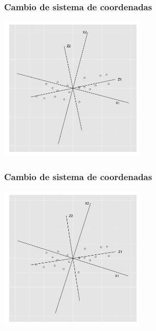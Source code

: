 \documentclass{beamer}
\begin{document}
\begin{frame}\frametitle{Cambio de sistema de coordenadas}
   \begin{overlayarea}{\textwidth}{8cm} 
 \begin{center}
   \includegraphics[height=7cm]{x1x2z1z2rotated06.png}
 \end{center}
   \end{overlayarea}
 \end{frame}
\begin{frame}\frametitle{Cambio de sistema de coordenadas}
   \begin{overlayarea}{\textwidth}{8cm} 
 \begin{center}
   \includegraphics[height=7cm]{x1x2z1z2rotated07.png}
 \end{center}
   \end{overlayarea}
 \end{frame}
\end{document}
